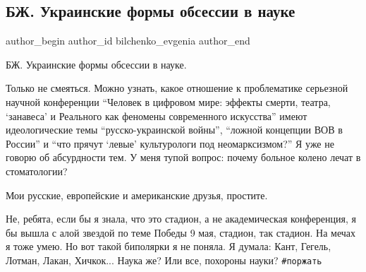  
 
 
 
 
 
\subsection{БЖ. Украинские формы обсессии в науке}
\label{sec:04_06_2021.fb.bilchenko_evgenia.2.obsessia_nauka_ukrainskaja}
\ifcmt
 author_begin
   author_id bilchenko_evgenia
 author_end
\fi

БЖ. Украинские формы обсессии в науке.

Только не смеяться. Можно узнать, какое отношение к проблематике серьезной
научной конференции \enquote{Человек в цифровом мире: эффекты смерти, театра,
\enquote{занавеса} и Реального как феномены современного искусства} имеют
идеологические темы \enquote{русско-украинской войны}, \enquote{ложной
концепции ВОВ в России} и \enquote{что прячут \enquote{левые} культурологи под
неомарксизмом?} Я уже не говорю об абсурдности тем. У меня тупой вопрос: почему
больное колено лечат в стоматологии? 

Мои русские, европейские и американские друзья, простите. 

Не, ребята, если бы я знала, что это стадион, а не академическая конференция, я
бы вышла с алой звездой по теме Победы 9 мая, стадион, так стадион. На мечах  я
тоже умею. Но вот такой биполярки я не поняла. Я думала: Кант, Гегель, Лотман,
Лакан, Хичкок... Наука же? Или все, похороны науки? \verb|#поржать|
